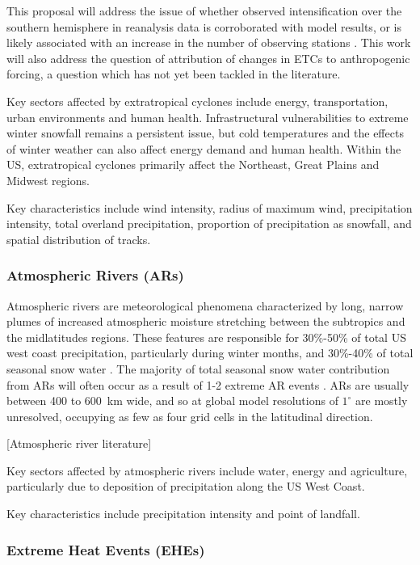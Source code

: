 \documentclass[11pt]{article}
\begin{document}
This proposal will address the issue of whether observed intensification over the southern hemisphere in reanalysis data is corroborated with model results, or is likely associated with an increase in the number of observing stations \citep{simmonds2000variability}.  This work will also address the question of attribution of changes in ETCs to anthropogenic forcing, a question which has not yet been tackled in the literature.

Key sectors affected by extratropical cyclones include energy, transportation, urban environments and human health.  Infrastructural vulnerabilities to extreme winter snowfall remains a persistent issue, but  cold temperatures and the effects of winter weather can also affect energy demand and human health.  Within the US, extratropical cyclones primarily affect the Northeast, Great Plains and Midwest regions.

Key characteristics include wind intensity, radius of maximum wind, precipitation intensity, total overland precipitation, proportion of precipitation as snowfall, and spatial distribution of tracks.

\subsubsection{Atmospheric Rivers (ARs)}

Atmospheric rivers are meteorological phenomena characterized by long, narrow plumes of increased atmospheric moisture stretching between the subtropics and the midlatitudes regions.  These features are responsible for 30\%-50\% of total US west coast precipitation, particularly during winter months, and 30\%-40\% of total seasonal snow water \citep{dettinger2011atmospheric}.  The majority of total seasonal snow water contribution from ARs will often occur as a result of 1-2 extreme AR events \citep{guan2010extreme}.  ARs are usually between 400 to 600\ km wide, and so at global model resolutions of $1^\circ$ are mostly unresolved, occupying as few as four grid cells in the latitudinal direction.

{\color{red}[Atmospheric river literature]}

Key sectors affected by atmospheric rivers include water, energy and agriculture, particularly due to deposition of precipitation along the US West Coast.

Key characteristics include precipitation intensity and point of landfall.

\subsubsection{Extreme Heat Events (EHEs)}
\end{document}
